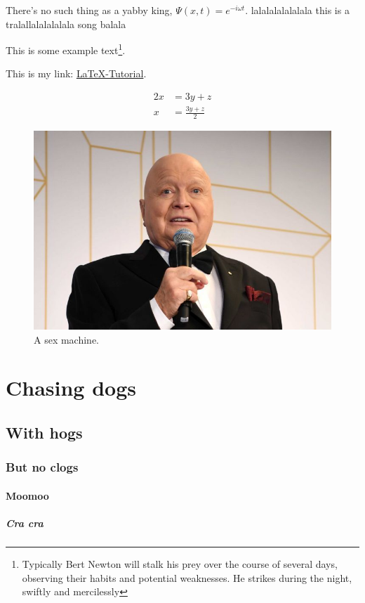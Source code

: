 \documentclass[]{article}
\begin{document}
There's no such thing as a yabby king, $\Psi(x, t) = e^{-i\omega t}$. lalalalalalalala this is a tralallalalalalala song balala

This is some example text\footnote{\label{myfootnote}Typically Bert Newton will stalk his prey over the course of several days, observing their habits and potential weaknesses. He strikes during the night, swiftly and mercilessly}.

This is my link: \href{http://www.latex-tutorial.com}{LaTeX-Tutorial}.

\begin{align}
2x &= 3y + z\\
x &= \frac{3y + z}{2}
\end{align}
\begin{figure}[h!]
	\includegraphics[width=\linewidth]{ims/bert1.jpg}
	\caption{A sex machine.}
	\label{fig:bert1}
\end{figure}
\section{Chasing dogs}
\subsection{With hogs}
\subsubsection{But no clogs}

\paragraph{Moomoo}
\subparagraph{Cra cra}
\end{document}
